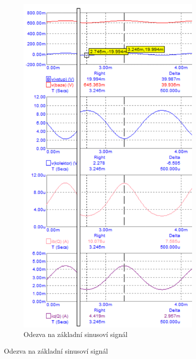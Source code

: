 \documentclass{article}
\begin{document}
\begin{figure}[H]
  \begin{minipage}[t]{0.33\textwidth}
    \begin{figure}[H]
      \includegraphics[width=\textwidth]{PC/BJT/sim_1.png}
      \caption{\label{sim_1} Odezva na základní sinusoví signál}
    \end{figure}

\end{minipage}
\end{figure}
\end{document}
